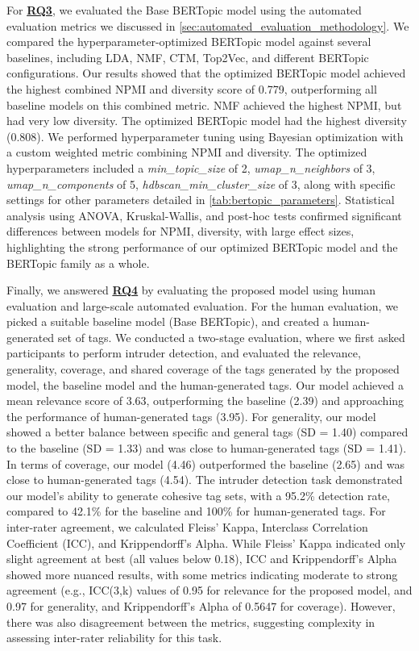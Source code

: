 For \hyperref[rq3]{\textbf{RQ3}}, we evaluated the Base BERTopic model using the automated evaluation metrics we discussed in \cref{sec:automated_evaluation_methodology}. We compared the hyperparameter-optimized BERTopic model against several baselines, including LDA, NMF, CTM, Top2Vec, and different BERTopic configurations. Our results showed that the optimized BERTopic model achieved the highest combined NPMI and diversity score of 0.779, outperforming all baseline models on this combined metric. NMF achieved the highest NPMI, but had very low diversity. The optimized BERTopic model had the highest diversity (0.808). We performed hyperparameter tuning using Bayesian optimization with a custom weighted metric combining NPMI and diversity. The optimized hyperparameters included a \textit{min\_topic\_size} of 2, \textit{umap\_n\_neighbors} of 3, \textit{umap\_n\_components} of 5, \textit{hdbscan\_min\_cluster\_size} of 3, along with specific settings for other parameters detailed in \cref{tab:bertopic_parameters}. Statistical analysis using ANOVA, Kruskal-Wallis, and post-hoc tests confirmed significant differences between models for NPMI, diversity, with large effect sizes, highlighting the strong performance of our optimized BERTopic model and the BERTopic family as a whole.

Finally, we answered \hyperref[rq4]{\textbf{RQ4}} by evaluating the proposed model using human evaluation and large-scale automated evaluation. For the human evaluation, we picked a suitable baseline model (Base BERTopic), and created a human-generated set of tags. We conducted a two-stage evaluation, where we first asked participants to perform intruder detection, and evaluated the relevance, generality, coverage, and shared coverage of the tags generated by the proposed model, the baseline model and the human-generated tags. Our model achieved a mean relevance score of 3.63, outperforming the baseline (2.39) and approaching the performance of human-generated tags (3.95). For generality, our model showed a better balance between specific and general tags (SD = 1.40) compared to the baseline (SD = 1.33) and was close to human-generated tags (SD = 1.41). In terms of coverage, our model (4.46) outperformed the baseline (2.65) and was close to human-generated tags (4.54). The intruder detection task demonstrated our model's ability to generate cohesive tag sets, with a 95.2\% detection rate, compared to 42.1\% for the baseline and 100\% for human-generated tags. For inter-rater agreement, we calculated Fleiss' Kappa, Interclass Correlation Coefficient (ICC), and Krippendorff's Alpha. While Fleiss' Kappa indicated only slight agreement at best (all values below 0.18), ICC and Krippendorff's Alpha showed more nuanced results, with some metrics indicating moderate to strong agreement (e.g., ICC(3,k) values of 0.95 for relevance for the proposed model, and 0.97 for generality, and Krippendorff's Alpha of 0.5647 for coverage). However, there was also disagreement between the metrics, suggesting complexity in assessing inter-rater reliability for this task. 

